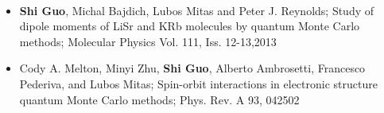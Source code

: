 \documentclass[11pt]{article} %
\begin{document}
\\
\vspace{-5mm}
\begin{itemize}
  \item {\bf Shi Guo}, Michal Bajdich, Lubos Mitas and Peter J. Reynolds;
Study of dipole moments of LiSr and KRb molecules by quantum Monte Carlo methods;
Molecular Physics Vol. 111, Iss. 12-13,2013
  \item Cody A. Melton, Minyi Zhu, {\bf Shi Guo}, Alberto Ambrosetti, Francesco Pederiva, and Lubos Mitas;
Spin-orbit interactions in electronic structure quantum Monte Carlo methods;
Phys. Rev. A 93, 042502
\end{itemize}
\end{document}
